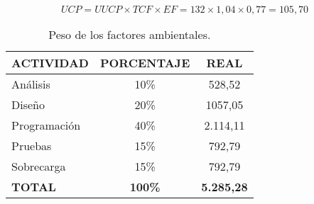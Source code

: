 \begin{equation} \label{eq:resultpuntoscasosuso}
  UCP = UUCP \times TCF \times EF = 132 \times 1,04 \times 0,77 = 105,70
\end{equation}

\begin{table}[h]
\begin{center}
\begin{tabular}{l c c}
\textbf{ACTIVIDAD} & \textbf{PORCENTAJE} & \textbf{REAL}\\ \hline \hline
Análisis & 10\% & 528,52 \\
Diseño & 20\% & 1057,05 \\
Programación & 40\% & 2.114,11 \\
Pruebas & 15\% & 792,79 \\
Sobrecarga & 15\% & 792,79 \\ \hline
\textbf{TOTAL} & \textbf{100\%} & \textbf{5.285,28}\\ \hline \hline
\end{tabular}
\caption{Peso de los factores ambientales.}
\label{tab:porcentajeAct}
\end{center}
\end{table}

